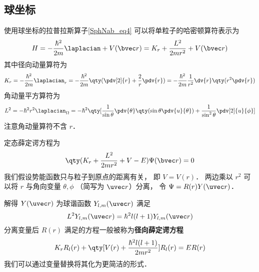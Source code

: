 

\subsection{球坐标}

使用球坐标的拉普拉斯算子\autoref{SphNab_eq4} 可以将单粒子的哈密顿算符表示为
\begin{equation}
H = -\frac{\hbar^2}{2m} \laplacian + V(\bvec r) =  K_r + \frac{L^2}{2mr^2} + V(\bvec r)
\end{equation}
其中径向动量算符为
\begin{equation}
K_r =-\frac{\hbar^2}{2m} \laplacian_r =  - \frac{\hbar^2}{2m} \qty(\pdv[2]{r} + \frac2r \pdv{r}) = -\frac{\hbar^2}{2m}\frac{1}{r^2} \dv{r} \qty(r^2\pdv{r})
\end{equation}
角动量平方算符为%
\begin{equation}\label{RadSE_eq3}
L^2 = -\hbar^2 r^2 \laplacian_\Omega = -\hbar^2 \qty[ \frac{1}{\sin\theta} \pdv{\theta} \qty(\sin \theta \pdv{u}{\theta}) + \frac{1}{\sin^2 \theta} \pdv[2]{u}{\phi}]
\end{equation}
注意角动量算符不含 $r$．

定态薛定谔方程为
\begin{equation}
\qty(K_r + \frac{L^2}{2mr^2} + V - E)\Psi(\bvec r) = 0
\end{equation}
我们假设势能函数只与粒子到原点的距离有关， 即 $V = V(r)$． 两边乘以 $r^2$ 可以将 $r$ 与角向变量 $\theta, \phi$ （简写为 $\uvec r$）分离， 令 $\Psi = R(r)Y(\uvec r)$．

解得 $Y(\uvec r)$ 为球谐函数 $Y_{l,m}(\uvec r)$ 满足
\begin{equation}
L^2 Y_{l,m}(\uvec r) = \hbar^2 l(l+1) Y_{l,m}(\uvec r)
\end{equation}
分离变量后 $R(r)$ 满足的方程一般被称为\textbf{径向薛定谔方程}
\begin{equation}\label{RadSE_eq6}
K_r R_l(r) + \qty[V(r) + \frac{\hbar^2 l(l+1)}{2mr^2} ]R_l(r) = ER(r)
\end{equation}
我们可以通过变量替换将其化为更简洁的形式．

